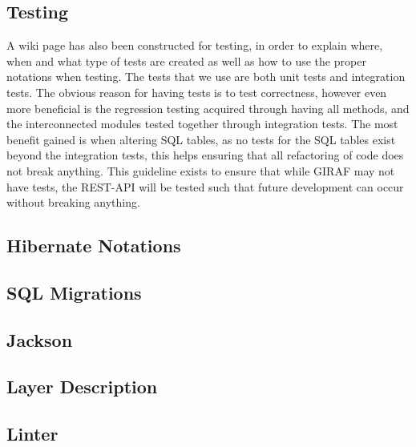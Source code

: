 \subsection{Testing}
A wiki page has also been constructed for testing, in order to explain where, when and what type of tests are created as well as how to use the proper notations when testing.
The tests that we use are both unit tests and integration tests.
The obvious reason for having tests is to test correctness, however even more beneficial is the regression testing acquired through having all methods, and the interconnected modules tested together through integration tests.
The most benefit gained is when altering SQL tables, as no tests for the SQL tables exist beyond the integration tests, this helps ensuring that all refactoring of code does not break anything.
This guideline exists to ensure that while GIRAF may not have tests, the REST-API will be tested such that future development can occur without breaking anything.

\subsection{Hibernate Notations}
\subsection{SQL Migrations}
\subsection{Jackson}
\subsection{Layer Description}
\subsection{Linter}
